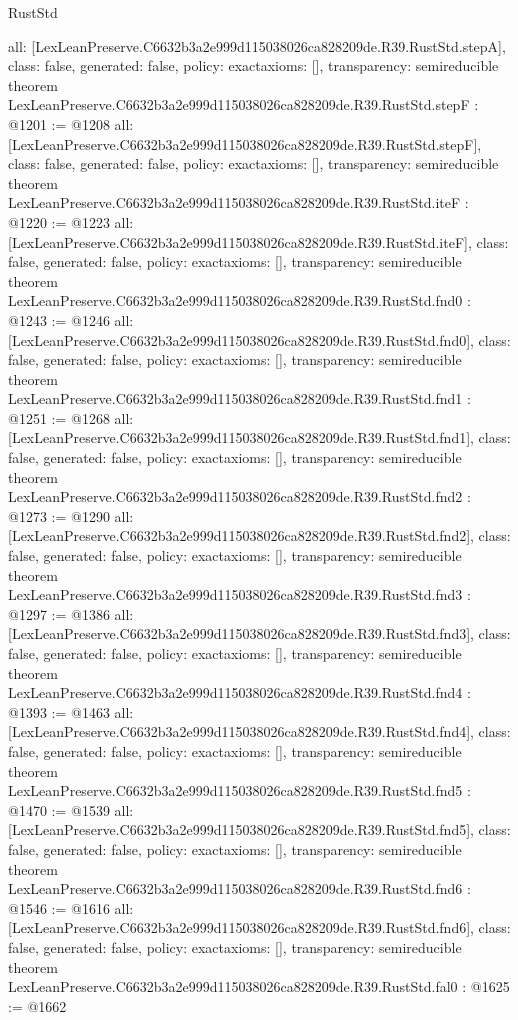 \begin{lexlean}{RustStd}
\begin{coremodule}
{  all: [LexLeanPreserve.C6632b3a2e999d115038026ca828209de.R39.RustStd.stepA],
  class: false,
  generated: false,
  policy: exact{axioms: []},
  transparency: semireducible
}
theorem LexLeanPreserve.C6632b3a2e999d115038026ca828209de.R39.RustStd.stepF : @1201 := @1208 {
  all: [LexLeanPreserve.C6632b3a2e999d115038026ca828209de.R39.RustStd.stepF],
  class: false,
  generated: false,
  policy: exact{axioms: []},
  transparency: semireducible
}
theorem LexLeanPreserve.C6632b3a2e999d115038026ca828209de.R39.RustStd.iteF : @1220 := @1223 {
  all: [LexLeanPreserve.C6632b3a2e999d115038026ca828209de.R39.RustStd.iteF],
  class: false,
  generated: false,
  policy: exact{axioms: []},
  transparency: semireducible
}
theorem LexLeanPreserve.C6632b3a2e999d115038026ca828209de.R39.RustStd.fnd0 : @1243 := @1246 {
  all: [LexLeanPreserve.C6632b3a2e999d115038026ca828209de.R39.RustStd.fnd0],
  class: false,
  generated: false,
  policy: exact{axioms: []},
  transparency: semireducible
}
theorem LexLeanPreserve.C6632b3a2e999d115038026ca828209de.R39.RustStd.fnd1 : @1251 := @1268 {
  all: [LexLeanPreserve.C6632b3a2e999d115038026ca828209de.R39.RustStd.fnd1],
  class: false,
  generated: false,
  policy: exact{axioms: []},
  transparency: semireducible
}
theorem LexLeanPreserve.C6632b3a2e999d115038026ca828209de.R39.RustStd.fnd2 : @1273 := @1290 {
  all: [LexLeanPreserve.C6632b3a2e999d115038026ca828209de.R39.RustStd.fnd2],
  class: false,
  generated: false,
  policy: exact{axioms: []},
  transparency: semireducible
}
theorem LexLeanPreserve.C6632b3a2e999d115038026ca828209de.R39.RustStd.fnd3 : @1297 := @1386 {
  all: [LexLeanPreserve.C6632b3a2e999d115038026ca828209de.R39.RustStd.fnd3],
  class: false,
  generated: false,
  policy: exact{axioms: []},
  transparency: semireducible
}
theorem LexLeanPreserve.C6632b3a2e999d115038026ca828209de.R39.RustStd.fnd4 : @1393 := @1463 {
  all: [LexLeanPreserve.C6632b3a2e999d115038026ca828209de.R39.RustStd.fnd4],
  class: false,
  generated: false,
  policy: exact{axioms: []},
  transparency: semireducible
}
theorem LexLeanPreserve.C6632b3a2e999d115038026ca828209de.R39.RustStd.fnd5 : @1470 := @1539 {
  all: [LexLeanPreserve.C6632b3a2e999d115038026ca828209de.R39.RustStd.fnd5],
  class: false,
  generated: false,
  policy: exact{axioms: []},
  transparency: semireducible
}
theorem LexLeanPreserve.C6632b3a2e999d115038026ca828209de.R39.RustStd.fnd6 : @1546 := @1616 {
  all: [LexLeanPreserve.C6632b3a2e999d115038026ca828209de.R39.RustStd.fnd6],
  class: false,
  generated: false,
  policy: exact{axioms: []},
  transparency: semireducible
}
theorem LexLeanPreserve.C6632b3a2e999d115038026ca828209de.R39.RustStd.fal0 : @1625 := @1662 {
}
\end{coremodule}
\end{lexlean}
